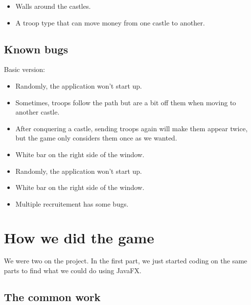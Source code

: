 \documentclass[12pt, a4paper]{report}
\begin{document}

\begin{itemize}
    \item Walls around the castles.
    \item A troop type that can move money from one castle to another.
\end{itemize}

\subsection*{Known bugs}

Basic version:

\begin{itemize}
    \item Randomly, the application won't start up.
    \item Sometimes, troops follow the path but are a bit off them when moving to another castle.
    \item After conquering a castle, sending troops again will make them appear twice, but the game only considers them once as we wanted.
    \item White bar on the right side of the window.
\end{itemize}


\begin{itemize}
    \item Randomly, the application won't start up.
    \item White bar on the right side of the window.
    \item Multiple recruitement has some bugs.
\end{itemize}

\section*{How we did the game}

We were two on the project. In the first part, we just started coding on the same parts to find what we could do using JavaFX.

\subsection*{The common work}
\end{document}

